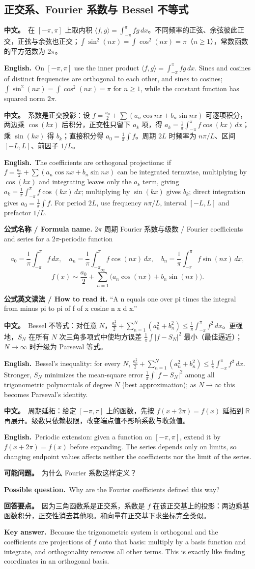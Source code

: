 \documentclass[UTF8,11pt,a4paper]{ctexart}
\newcommand{\R}{\mathbb{R}}
\newcommand{\BOTH}[2]{\par\noindent\textbf{中文。}\ #1\par\noindent\textbf{English.}\ #2\par}
\newcommand{\READ}[1]{\par\noindent\textbf{公式英文读法 / How to read it.} #1\par}
\newcommand{\FORMULA}[2]{\par\noindent\textbf{公式名称 / Formula name.} #1 / #2\par}
\newcommand{\ASK}[4]{\begin{samepage}\par\noindent\textbf{可能问题。}\ #1\par\noindent\textbf{Possible question.}\ #2\par\noindent\textbf{回答要点。}\ #3\par\noindent\textbf{Key answer.}\ #4\medskip\end{samepage}}
\begin{document}
\subsection{正交系、Fourier 系数与 Bessel 不等式}
\BOTH{在 $[-\pi,\pi]$ 上取内积 $\langle f,g\rangle=\int_{-\pi}^{\pi}fg\,dx$。不同频率的正弦、余弦彼此正交，正弦与余弦也正交；$\int\sin^2(nx)=\int\cos^2(nx)=\pi$（$n\ge1$），常数函数的平方范数为 $2\pi$。}{On $[-\pi,\pi]$ use the inner product $\langle f,g\rangle=\int_{-\pi}^{\pi}fg\,dx$. Sines and cosines of distinct frequencies are orthogonal to each other, and sines to cosines; $\int\sin^2(nx)=\int\cos^2(nx)=\pi$ for $n\ge1$, while the constant function has squared norm $2\pi$.}
\BOTH{系数是正交投影：设 $f=\frac{a_0}{2}+\sum(a_n\cos nx+b_n\sin nx)$ 可逐项积分，两边乘 $\cos(kx)$ 后积分，正交性只留下 $a_k$ 项，得 $a_k=\frac1\pi\int_{-\pi}^{\pi}f\cos(kx)\,dx$；乘 $\sin(kx)$ 得 $b_k$；直接积分得 $a_0=\frac1\pi\int f$。周期 $2L$ 时频率为 $n\pi/L$、区间 $[-L,L]$、前因子 $1/L$。}{The coefficients are orthogonal projections: if $f=\frac{a_0}{2}+\sum(a_n\cos nx+b_n\sin nx)$ can be integrated termwise, multiplying by $\cos(kx)$ and integrating leaves only the $a_k$ term, giving $a_k=\frac1\pi\int_{-\pi}^{\pi}f\cos(kx)\,dx$; multiplying by $\sin(kx)$ gives $b_k$; direct integration gives $a_0=\frac1\pi\int f$. For period $2L$, use frequency $n\pi/L$, interval $[-L,L]$ and prefactor $1/L$.}
\FORMULA{$2\pi$ 周期 Fourier 系数与级数}{Fourier coefficients and series for a $2\pi$-periodic function}
\[
a_0=\frac1\pi\int_{-\pi}^{\pi}f\,dx,\quad
a_n=\frac1\pi\int_{-\pi}^{\pi}f\cos(nx)\,dx,\quad
b_n=\frac1\pi\int_{-\pi}^{\pi}f\sin(nx)\,dx,
\]
\[
f(x)\sim\frac{a_0}{2}+\sum_{n=1}^{\infty}\bigl(a_n\cos(nx)+b_n\sin(nx)\bigr).
\]
\READ{“A n equals one over pi times the integral from minus pi to pi of f of x cosine n x d x.”}
\BOTH{Bessel 不等式：对任意 $N$，$\frac{a_0^2}{2}+\sum_{n=1}^{N}(a_n^2+b_n^2)\le\frac1\pi\int_{-\pi}^{\pi}f^2\,dx$。更强地，$S_N$ 在所有 $N$ 次三角多项式中使均方误差 $\frac1\pi\int|f-S_N|^2$ 最小（最佳逼近）；$N\to\infty$ 时升级为 Parseval 等式。}{Bessel's inequality: for every $N$, $\frac{a_0^2}{2}+\sum_{n=1}^{N}(a_n^2+b_n^2)\le\frac1\pi\int_{-\pi}^{\pi}f^2\,dx$. Stronger, $S_N$ minimizes the mean-square error $\frac1\pi\int|f-S_N|^2$ among all trigonometric polynomials of degree $N$ (best approximation); as $N\to\infty$ this becomes Parseval's identity.}
\BOTH{周期延拓：给定 $[-\pi,\pi]$ 上的函数，先按 $f(x+2\pi)=f(x)$ 延拓到 $\R$ 再展开。级数只依赖极限，改变端点值不影响系数与收敛值。}{Periodic extension: given a function on $[-\pi,\pi]$, extend it by $f(x+2\pi)=f(x)$ before expanding. The series depends only on limits, so changing endpoint values affects neither the coefficients nor the limit of the series.}
\ASK{为什么 Fourier 系数这样定义？}{Why are the Fourier coefficients defined this way?}{因为三角函数系是正交系，系数是 $f$ 在该正交基上的投影：两边乘基函数积分，正交性消去其他项。和向量在正交基下求坐标完全类似。}{Because the trigonometric system is orthogonal and the coefficients are projections of $f$ onto that basis: multiply by a basis function and integrate, and orthogonality removes all other terms. This is exactly like finding coordinates in an orthogonal basis.}
\end{document}

